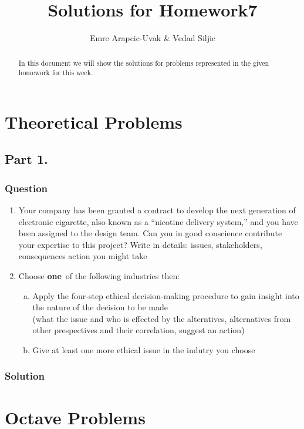\documentclass[a4paper, 10pt]{article}
\title{Solutions for Homework7}
\author{Emre Arapcic-Uvak & Vedad Siljic}
\date{}
\begin{document}
	\maketitle
	
	\vspace{5mm}
	
	\begin{abstract}
		\begin{center}
			\noindent In this document we will show the solutions for problems represented in the given homework for this week.
		\end{center}
	\end{abstract}
	\pagebreak
	
	\tableofcontents
	\pagebreak
	
	\section{Theoretical Problems}
		\subsection{Part 1.}
			\subsubsection{Question}
				\begin{enumerate}
					\item \noindent Your company has been granted a contract to develop the next generation of electronic cigarette, also 
					known as a “nicotine delivery system,” and you have been assigned to the design team. Can you in good 
					conscience contribute your expertise to this project? Write in details: issues, stakeholders, 
					consequences action you might take
					
					\item Choose \textbf{one}~of the following industries then:
					\begin{enumerate} [a.]
						\item Apply the four-step ethical decision-making procedure to gain insight into the nature of the decision to be made\\
						\noindent (what the issue and who is effected by the alterntives, alternatives from other prespectives and their correlation, suggest an action)
						
						\item Give at least one more ethical issue in the indutry you choose
					\end{enumerate}
				\end{enumerate}
			
			\subsubsection{Solution}
				\begin{enumerate}
					
				\end{enumerate}
	\section{Octave Problems}
\end{document}
